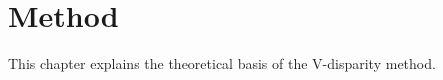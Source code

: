 
\chapter{Method}
\label{chp:Method}

This chapter explains the theoretical basis of the V-disparity method.